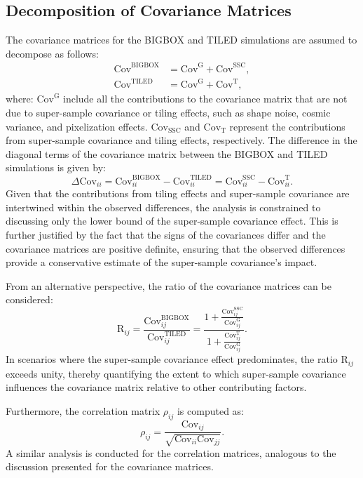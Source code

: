 \subsection{Decomposition of Covariance Matrices}
The covariance matrices for the BIGBOX and TILED simulations are assumed to decompose as follows:
\begin{align}
    \text{Cov}^{\text{BIGBOX}} &= \text{Cov}^{\text{G}} + \text{Cov}^{\text{SSC}}, \\
    \text{Cov}^{\text{TILED}} &= \text{Cov}^{\text{G}} + \text{Cov}^{\text{T}},
\end{align}
where:
$\text{Cov}^{\text{G}}$ include all the contributions to the covariance matrix that are not due to super-sample covariance or tiling effects, such as shape noise, cosmic variance, and pixelization effects.
$\text{Cov}_{\text{SSC}}$ and $\text{Cov}_{\text{T}}$ represent the contributions from super-sample covariance and tiling effects, respectively.
The difference in the diagonal terms of the covariance matrix between the BIGBOX and TILED simulations is given by:
\begin{equation}
    \Delta \text{Cov}_{ii} = \text{Cov}_{ii}^{\text{BIGBOX}} - \text{Cov}_{ii}^{\text{TILED}} = \text{Cov}^{\text{SSC}}_{ii} - \text{Cov}^{\text{T}}_{ii}.
\end{equation}
Given that the contributions from tiling effects and super-sample covariance are intertwined within the observed differences, the analysis is constrained to discussing only the lower bound of the super-sample covariance effect. This is further justified by the fact that the signs of the covariances differ and the covariance matrices are positive definite, ensuring that the observed differences provide a conservative estimate of the super-sample covariance's impact.

From an alternative perspective, the ratio of the covariance matrices can be considered:
\begin{equation}
    \text{R}_{ij} = \frac{\text{Cov}_{ij}^{\text{BIGBOX}}}{\text{Cov}_{ij}^{\text{TILED}}} = \frac{1 + \tfrac{\text{Cov}^{\text{SSC}}_{ij}}{\text{Cov}^{\text{G}}_{ij}}}
    {1 + \tfrac{\text{Cov}^{\text{T}}_{ij}}{\text{Cov}^{\text{G}}_{ij}}}.
\end{equation}
In scenarios where the super-sample covariance effect predominates, the ratio $\text{R}_{ij}$ exceeds unity, thereby quantifying the extent to which super-sample covariance influences the covariance matrix relative to other contributing factors.

Furthermore, the correlation matrix $\rho_{ij}$ is computed as:
\begin{equation}
    \rho_{ij} = \frac{\text{Cov}_{ij}}{\sqrt{\text{Cov}_{ii} \text{Cov}_{jj}}}.
\end{equation}
A similar analysis is conducted for the correlation matrices, analogous to the discussion presented for the covariance matrices.